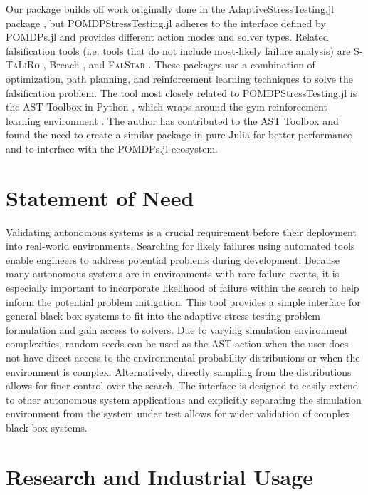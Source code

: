 
Our package builds off work originally done in the AdaptiveStressTesting.jl package \cite{ast}, but POMDPStressTesting.jl adheres to the interface defined by POMDPs.jl and provides different action modes and solver types.
Related falsification tools (i.e. tools that do not include most-likely failure analysis) are \textsc{S-TaLiRo} \cite{staliro}, Breach \cite{breach}, and \textsc{FalStar} \cite{falstar}.
These packages use a combination of optimization, path planning, and reinforcement learning techniques to solve the falsification problem.
The tool most closely related to POMDPStressTesting.jl is the AST Toolbox in Python \cite{ast_av}, which wraps around the gym reinforcement learning environment \cite{gym}.
The author has contributed to the AST Toolbox and found the need to create a similar package in pure Julia for better performance and to interface with the POMDPs.jl ecosystem.


\section{Statement of Need}

Validating autonomous systems is a crucial requirement before their deployment into real-world environments.
Searching for likely failures using automated tools enable engineers to address potential problems during development.
Because many autonomous systems are in environments with rare failure events, it is especially important to incorporate likelihood of failure within the search to help inform the potential problem mitigation.
This tool provides a simple interface for general black-box systems to fit into the adaptive stress testing problem formulation and gain access to solvers.
Due to varying simulation environment complexities, random seeds can be used as the AST action when the user does not have direct access to the environmental probability distributions or when the environment is complex.
Alternatively, directly sampling from the distributions allows for finer control over the search.
The interface is designed to easily extend to other autonomous system applications and explicitly separating the simulation environment from the system under test allows for wider validation of complex black-box systems.



\section{Research and Industrial Usage}

